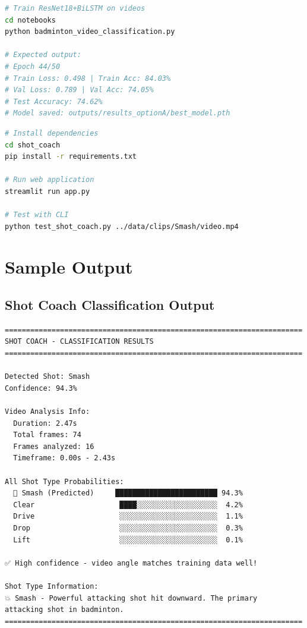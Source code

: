 \documentclass[12pt,a4paper]{article}
\begin{document}
\begin{lstlisting}[language=bash, caption=Phase 2: Video-Based Training]
# Train ResNet18+BiLSTM on videos
cd notebooks
python badminton_video_classification.py

# Expected output:
# Epoch 44/50
# Train Loss: 0.498 | Train Acc: 84.03%
# Val Loss: 0.789 | Val Acc: 74.05%
# Test Accuracy: 74.62%
# Model saved: outputs/results_optionA/best_model.pth
\end{lstlisting}

\begin{lstlisting}[language=bash, caption=Phase 3: Shot Coach Deployment]
# Install dependencies
cd shot_coach
pip install -r requirements.txt

# Run web application
streamlit run app.py

# Test with CLI
python test_shot_coach.py ../data/clips/Smash/video.mp4
\end{lstlisting}

\section{Sample Output}

\subsection{Shot Coach Classification Output}

\begin{verbatim}
======================================================================
SHOT COACH - CLASSIFICATION RESULTS
======================================================================

Detected Shot: Smash
Confidence: 94.3%

Video Analysis Info:
  Duration: 2.47s
  Total frames: 74
  Frames analyzed: 16
  Timeframe: 0.00s - 2.43s

All Shot Type Probabilities:
  🎯 Smash (Predicted)     ████████████████████████ 94.3%
  Clear                    ████░░░░░░░░░░░░░░░░░░░  4.2%
  Drive                    ░░░░░░░░░░░░░░░░░░░░░░░  1.1%
  Drop                     ░░░░░░░░░░░░░░░░░░░░░░░  0.3%
  Lift                     ░░░░░░░░░░░░░░░░░░░░░░░  0.1%

✅ High confidence - video angle matches training data well!

Shot Type Information:
💥 Smash - Powerful attacking shot hit downward. The primary
attacking shot in badminton.
======================================================================
\end{verbatim}
\end{document}

